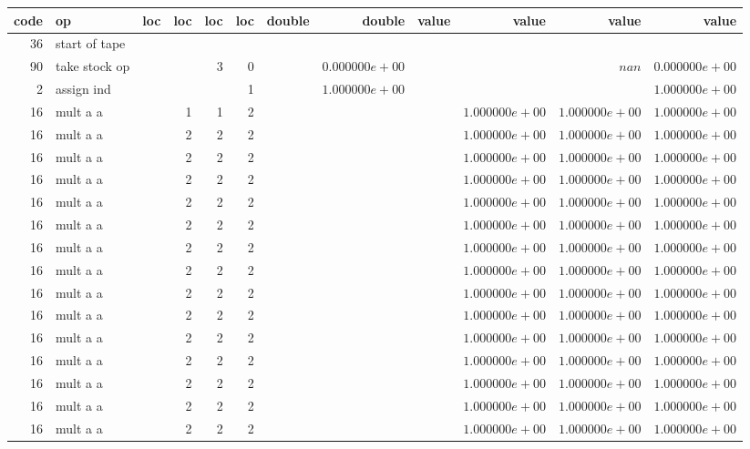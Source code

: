 \documentclass{article}
\begin{document}
\tiny
\begin{tabular}{|r|l|r|r|r|r||r|r||r|r|r|r|} \hline 
 code & op & loc & loc & loc & loc & double & double & value & value & value & value \\ \hline 
 36 & start of tape & & & & & & & & & &  \\ \hline 
90 & take stock op & & & 3 & 0 & &$ 0.000000e+00 $& & &$ nan $&$ 0.000000e+00 $\\ \hline 
2 & assign ind & & & & 1 & &$ 1.000000e+00 $& & & &$ 1.000000e+00 $\\ \hline 
16 & mult a a & & 1 & 1 & 2 & & & &$ 1.000000e+00 $&$ 1.000000e+00 $&$ 1.000000e+00 $\\ \hline 
16 & mult a a & & 2 & 2 & 2 & & & &$ 1.000000e+00 $&$ 1.000000e+00 $&$ 1.000000e+00 $\\ \hline 
16 & mult a a & & 2 & 2 & 2 & & & &$ 1.000000e+00 $&$ 1.000000e+00 $&$ 1.000000e+00 $\\ \hline 
16 & mult a a & & 2 & 2 & 2 & & & &$ 1.000000e+00 $&$ 1.000000e+00 $&$ 1.000000e+00 $\\ \hline 
16 & mult a a & & 2 & 2 & 2 & & & &$ 1.000000e+00 $&$ 1.000000e+00 $&$ 1.000000e+00 $\\ \hline 
16 & mult a a & & 2 & 2 & 2 & & & &$ 1.000000e+00 $&$ 1.000000e+00 $&$ 1.000000e+00 $\\ \hline 
16 & mult a a & & 2 & 2 & 2 & & & &$ 1.000000e+00 $&$ 1.000000e+00 $&$ 1.000000e+00 $\\ \hline 
16 & mult a a & & 2 & 2 & 2 & & & &$ 1.000000e+00 $&$ 1.000000e+00 $&$ 1.000000e+00 $\\ \hline 
16 & mult a a & & 2 & 2 & 2 & & & &$ 1.000000e+00 $&$ 1.000000e+00 $&$ 1.000000e+00 $\\ \hline 
16 & mult a a & & 2 & 2 & 2 & & & &$ 1.000000e+00 $&$ 1.000000e+00 $&$ 1.000000e+00 $\\ \hline 
16 & mult a a & & 2 & 2 & 2 & & & &$ 1.000000e+00 $&$ 1.000000e+00 $&$ 1.000000e+00 $\\ \hline 
16 & mult a a & & 2 & 2 & 2 & & & &$ 1.000000e+00 $&$ 1.000000e+00 $&$ 1.000000e+00 $\\ \hline 
16 & mult a a & & 2 & 2 & 2 & & & &$ 1.000000e+00 $&$ 1.000000e+00 $&$ 1.000000e+00 $\\ \hline 
16 & mult a a & & 2 & 2 & 2 & & & &$ 1.000000e+00 $&$ 1.000000e+00 $&$ 1.000000e+00 $\\ \hline 
16 & mult a a & & 2 & 2 & 2 & & & &$ 1.000000e+00 $&$ 1.000000e+00 $&$ 1.000000e+00 $\\ \hline 

\end{tabular}
\end{document}
